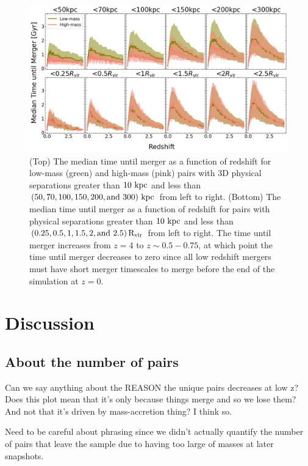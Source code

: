 \documentclass[twocolumn,linenumbers]{aastex631}
\newcommand{\Rvir}{\ensuremath{\rm R_{vir}}}
\begin{document}
\begin{figure}[htb]
    \centering
    \includegraphics[width=\textwidth]{plots/bet-on-it/3_time_til_merger.png}
    \caption{(Top) The median time until merger as a function of redshift for low-mass (green) and high-mass (pink) pairs with 3D physical separations greater than $10\,\mathrm{\,kpc}$ and less than $(50,70,100,150,200,\mbox{and }300)\,\mathrm{\,kpc}$ from left to right. 
    (Bottom) The median time until merger as a function of redshift for pairs with physical separations greater than $10\,\mathrm{\,kpc}$ and less than $(0.25, 0.5, 1, 1.5, 2,\mbox{and }2.5)\,\Rvir$ from left to right. 
    The time until merger increases from $z=4$ to $z\sim0.5-0.75$, at which point the time until merger decreases to zero since all low redshift mergers must have short merger timescales to merge before the end of the simulation at $z=0$. 
    }
    \label{fig:timescales-sep}
\end{figure}


\section{Discussion} \label{sec:discussion}

\subsection{About the number of pairs}
Can we say anything about the REASON the unique pairs decreases at low z? Does this plot mean that it's only because things merge and so we lose them? And not that it's driven by mass-accretion thing? I think so.

Need to be careful about phrasing since we didn't actually quantify the number of pairs that leave the sample due to having too large of masses at later snapshots. 
\end{document}
